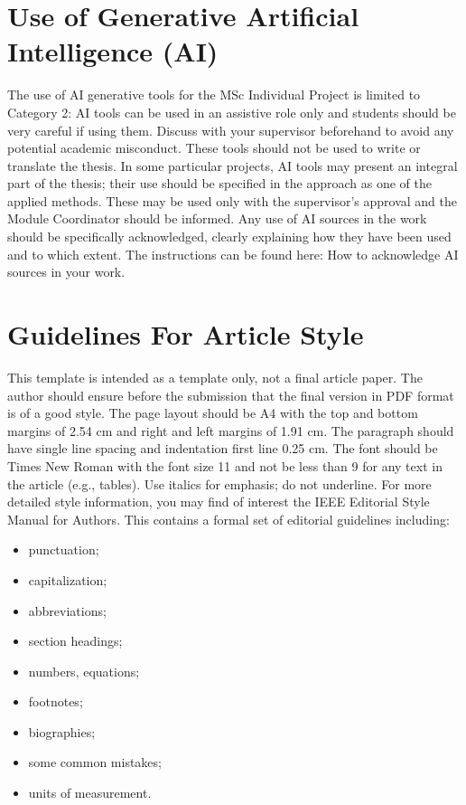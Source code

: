 \documentclass[11pt,a4paper]{article}
\begin{document}
\section{Use of Generative Artificial Intelligence (AI)}
The use of AI generative tools for the MSc Individual Project is limited to Category 2: AI tools can be used in an assistive role only and students should be very careful if using them. Discuss with your supervisor beforehand to avoid any potential academic misconduct. These tools should not be used to write or translate the thesis. In some particular projects, AI tools may present an integral part of the thesis; their use should be specified in the approach as one of the applied methods. These may be used only with the supervisor's approval and the Module Coordinator should be informed. Any use of AI sources in the work should be specifically acknowledged, clearly explaining how they have been used and to which extent. The instructions can be found here: How to acknowledge AI sources in your work.

\section{Guidelines For Article Style}
This template is intended as a template only, not a final article paper. The author should ensure before the submission that the final version in PDF format is of a good style. The page layout should be A4 with the top and bottom margins of 2.54 cm and right and left margins of 1.91 cm. The paragraph should have single line spacing and indentation first line 0.25 cm. The font should be Times New Roman with the font size 11 and not be less than 9 for any text in the article (e.g., tables). Use italics for emphasis; do not underline. For more detailed style information, you may find of interest the IEEE Editorial Style Manual for Authors. This contains a formal set of editorial guidelines including:
\begin{itemize}
    \item punctuation;
    \item capitalization;
    \item abbreviations;
    \item section headings;
    \item numbers, equations;
    \item footnotes;
    \item biographies;
    \item some common mistakes;
    \item units of measurement.
\end{itemize}
\end{document}
